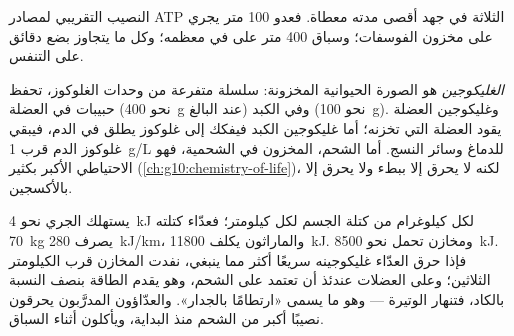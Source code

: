 \begin{omfigure}

{\small النصيب التقريبي لمصادر ATP الثلاثة في جهد أقصى مدته معطاة.
فعدو 100 متر يجري على مخزون الفوسفات؛ وسباق 400 متر على  في
معظمه؛ وكل ما يتجاوز بضع دقائق على التنفس.}
\end{omfigure}

\begin{definition}[الغليكوجين]\label{def:g10:exercise-and-energy:glycogen}
\emph{الغليكوجين} هو الصورة الحيوانية 
المخزونة: سلسلة متفرعة من وحدات الغلوكوز، تحفظ حبيبات في  العضلة
(نحو \qty{400}{g} عند البالغ) وفي الكبد (نحو \qty{100}{g}). وغليكوجين
العضلة يقود العضلة التي تخزنه؛ أما غليكوجين الكبد فيفكك إلى غلوكوز
يطلق في الدم، فيبقي غلوكوز الدم قرب \qty{1}{g/L} للدماغ وسائر النسج.
أما الشحم، المخزون في  الشحمية، فهو الاحتياطي الأكبر بكثير
(\cref{ch:g10:chemistry-of-life})، لكنه لا يحرق إلا ببطء ولا يحرق إلا
بالأكسجين.
\end{definition}

\begin{example}\label{ex:g10:exercise-and-energy:wall}
يستهلك الجري نحو \qty{4}{kJ} لكل كيلوغرام من كتلة الجسم لكل كيلومتر؛
فعدّاء كتلته \qty{70}{kg} يصرف \qty{280}{kJ/km}، والماراثون يكلف
\qty{11800}{kJ}. ومخازن  تحمل نحو \qty{8500}{kJ}. فإذا حرق
العدّاء غليكوجينه سريعًا أكثر مما ينبغي، نفدت المخازن قرب الكيلومتر
الثلاثين؛ وعلى العضلات عندئذ أن تعتمد على الشحم، وهو يقدم الطاقة بنصف
النسبة بالكاد، فتنهار الوتيرة --- وهو ما يسمى «ارتطامًا بالجدار».
والعدّاؤون المدرَّبون يحرقون نصيبًا أكبر من الشحم منذ البداية،
ويأكلون  أثناء السباق.
\end{example}


